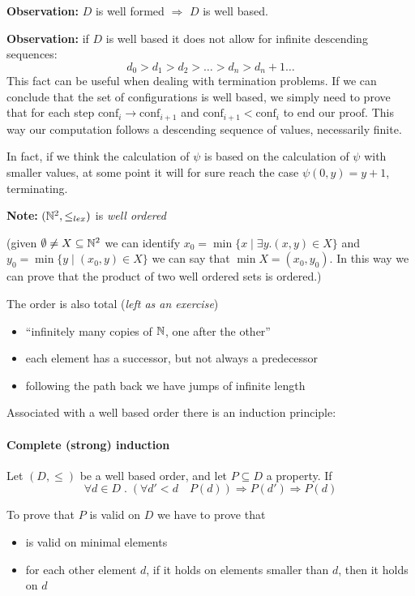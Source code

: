 \textbf{Observation:} $D$ is well formed $\Rightarrow$ $D$ is well
based.

\textbf{Observation:} if $D$ is well based it does not allow for
infinite descending sequences:
\[
  d_0 > d_1 > d_2 > \dots > d_n > d_n+1 \dots
\]
\newcommand{\conf}{\text{conf}} This fact can be useful when dealing
with termination problems. If we can conclude that the set of
configurations is well based, we simply need to prove
that for each step \( \conf _i \rightarrow \conf_{i+1} \) and
\( \conf _{i+1} < \conf _i \) to end our proof. This way our computation follows a descending sequence of values, necessarily finite.

In fact, if we think the calculation of $\psi$ is based on the
calculation of $\psi$ with smaller values, at some point it
will for sure reach the case $\psi(0,y) = y + 1$, terminating.

\textbf{Note:} $(\mathbb{N}^2, \leq_{lex})$ is \emph{well ordered}

(given $\emptyset \neq X \subseteq \mathbb{N}^2$ we can identify
$x_0 = \min\{x \; | \; \exists y.(x,y) \in X\}$ and
$y_0 = \min \{ y \; | \; (x_0,y) \in X\}$ we can say that
$\min X = (x_0, y_0)$. In this way we can prove that the product of
two well ordered sets is ordered.)

The order is also total (\emph{left as an exercise})
\begin{itemize}
\item ``infinitely many copies of $\mathbb{N}$, one after the other''
\item each element has a successor, but not always a predecessor
\item following the path back we have jumps of infinite length
\end{itemize}

Associated with a well based order there is an induction principle:

\paragraph{\textbf{Complete (strong) induction}}

Let $(D, \leq)$ be a well based order, and let $P \subseteq D$ a
property. If
\[
  \forall d \in D \; . \; (\forall d' < d \quad P(d)) \Rightarrow P(d') \Rightarrow P(d)
\]

To prove that $P$ is valid on $D$ we have to prove that
\begin{itemize}
\item is valid on minimal elements
\item for each other element $d$, if it holds on elements smaller than
  $d$, then it holds on $d$
\end{itemize}


